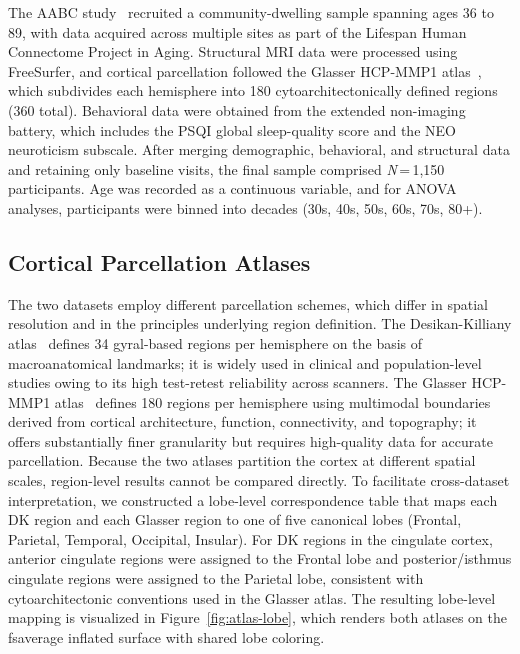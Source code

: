 The AABC study~\cite{bookheimer2019aging} recruited a community-dwelling sample spanning ages 36 to 89, with data acquired across multiple sites as part of the Lifespan Human Connectome Project in Aging.
Structural MRI data were processed using FreeSurfer, and cortical parcellation followed the Glasser HCP-MMP1 atlas~\cite{glasser2016multimodal}, which subdivides each hemisphere into 180 cytoarchitectonically defined regions (360 total).
Behavioral data were obtained from the extended non-imaging battery, which includes the PSQI global sleep-quality score and the NEO neuroticism subscale.
After merging demographic, behavioral, and structural data and retaining only baseline visits, the final sample comprised \textit{N}\,=\,1{,}150 participants.
Age was recorded as a continuous variable, and for ANOVA analyses, participants were binned into decades (30s, 40s, 50s, 60s, 70s, 80+).

\subsection{Cortical Parcellation Atlases}
\label{sec:methods-atlases}

The two datasets employ different parcellation schemes, which differ in spatial resolution and in the principles underlying region definition.
The Desikan-Killiany atlas~\cite{desikan2006automated} defines 34 gyral-based regions per hemisphere on the basis of macroanatomical landmarks; it is widely used in clinical and population-level studies owing to its high test-retest reliability across scanners.
The Glasser HCP-MMP1 atlas~\cite{glasser2016multimodal} defines 180 regions per hemisphere using multimodal boundaries derived from cortical architecture, function, connectivity, and topography; it offers substantially finer granularity but requires high-quality data for accurate parcellation.
Because the two atlases partition the cortex at different spatial scales, region-level results cannot be compared directly.
To facilitate cross-dataset interpretation, we constructed a lobe-level correspondence table that maps each DK region and each Glasser region to one of five canonical lobes (Frontal, Parietal, Temporal, Occipital, Insular).
For DK regions in the cingulate cortex, anterior cingulate regions were assigned to the Frontal lobe and posterior/isthmus cingulate regions were assigned to the Parietal lobe, consistent with cytoarchitectonic conventions used in the Glasser atlas.
The resulting lobe-level mapping is visualized in Figure~\ref{fig:atlas-lobe}, which renders both atlases on the fsaverage inflated surface with shared lobe coloring.

